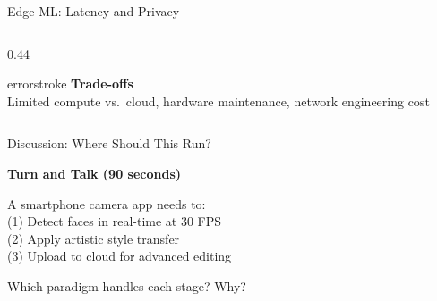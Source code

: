 \documentclass[aspectratio=169, 12pt]{beamer}
\begin{document}
\begin{frame}{Edge ML: Latency and Privacy}
\begin{columns}[T]
\begin{column}{0.44\textwidth}
    \vspace{0.15cm}
    \begin{mlsyscard}{errorstroke}
    \textbf{Trade-offs}\\
    {\footnotesize Limited compute vs.\ cloud, hardware maintenance, network engineering cost}
    \end{mlsyscard}
  \end{column}
\end{columns}

\end{frame}

\begin{frame}{Discussion: Where Should This Run?}
\note{
%
%
%
%
%
}

\centering
\vspace{0.4cm}
{\large\bfseries Turn and Talk \textcolor{midgray}{(90 seconds)}}

\vspace{0.3cm}
{\large A smartphone camera app needs to:\\[0.1cm]
(1) Detect faces in real-time at 30 FPS\\
(2) Apply artistic style transfer\\
(3) Upload to cloud for advanced editing}

\vspace{0.25cm}
\alert{Which paradigm handles each stage? Why?}


\end{frame}
\end{document}

